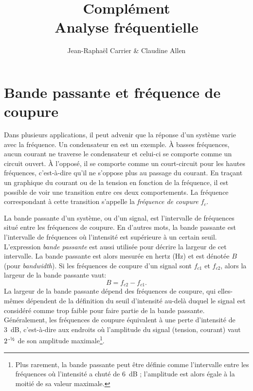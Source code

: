 \documentclass[canadien,12pt,oneside,letterpaper]{article}
\begin{document}
\title{\textbf{Complément}\\Analyse fréquentielle}
\author{Jean-Raphaël Carrier \& Claudine Allen}
\date{}
\maketitle


\section{Bande passante et fréquence de coupure}

Dans plusieurs applications, il peut advenir que la réponse d'un système varie avec la fréquence. Un condensateur en est un exemple. À basses fréquences, aucun courant ne traverse le condensateur et celui-ci se comporte comme un circuit ouvert. À l'opposé, il se comporte comme un court-circuit pour les hautes fréquences, c'est-à-dire qu'il ne s'oppose plus au passage du courant. En traçant un graphique du courant ou de la tension en fonction de la fréquence, il est possible de voir une transition entre ces deux comportements. La fréquence correspondant à cette transition s'appelle la \textit{fréquence de coupure} $f_c$.

La bande passante d'un système, ou d'un signal, est l'intervalle de fréquences situé entre les fréquences de coupure. En d'autres mots, la bande passante est l'intervalle de fréquences où l'intensité est supérieure à un certain seuil. L'expression \textit{bande passante} est aussi utilisée pour décrire la largeur de cet intervalle. La bande passante est alors mesurée en hertz (Hz) et est dénotée $B$ (pour \textit{bandwidth}). Si les fréquences de coupure d'un signal sont $f_{c1}$ et $f_{c2}$, alors la largeur de la bande passante vaut:
\begin{equation}
B=f_{c2}-f_{c1}.
\end{equation}
%
La largeur de la bande passante dépend des fréquences de coupure, qui elles-mêmes dépendent de la définition du seuil d'intensité au-delà duquel le signal est considéré comme trop faible pour faire partie de la bande passante. Généralement, les fréquences de coupure équivalent à une perte d'intensité de 3~dB, c'est-à-dire aux endroits où l'amplitude du signal (tension, courant) vaut $2^{\,\text{-\textonehalf}}$ de son amplitude maximale\footnote{Plus rarement, la bande passante peut être définie comme l'intervalle entre les fréquences où l'intensité a chuté de 6~dB ; l'amplitude est alors égale à la moitié de sa valeur maximale.}.
\end{document}
